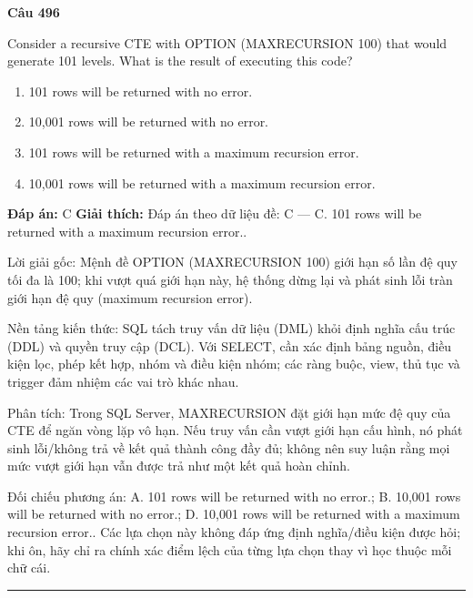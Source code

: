 \documentclass[11pt,a4paper]{article}
\newenvironment{question}[1]{%
  \par\vspace{1em}\noindent\textbf{\large Câu #1}\par\vspace{0.4em}
}{%
  \par\vspace{1em}\hrule\vspace{0.6em}
}
\newenvironment{choices}{%
  \begin{enumerate}[label=\textbf{\Alph*.},leftmargin=2.2em,itemsep=2pt,topsep=3pt]
}{%
  \end{enumerate}
}
\newcommand{\choice}{\item}
\begin{document}
\begin{question}{496}
Consider a recursive CTE with OPTION (MAXRECURSION 100) that would generate 101 levels. What is the result of executing this code?
\begin{choices}
\choice 101 rows will be returned with no error.
\choice 10,001 rows will be returned with no error.
\choice 101 rows will be returned with a maximum recursion error.
\choice 10,001 rows will be returned with a maximum recursion error.
\end{choices}
\textbf{Đáp án:} C
\textbf{Giải thích:} Đáp án theo dữ liệu đề: C — C. 101 rows will be returned with a maximum recursion error..

Lời giải gốc: Mệnh đề OPTION (MAXRECURSION 100) giới hạn số lần đệ quy tối đa là 100; khi vượt quá giới hạn này, hệ thống dừng lại và phát sinh lỗi tràn giới hạn đệ quy (maximum recursion error).

Nền tảng kiến thức: SQL tách truy vấn dữ liệu (DML) khỏi định nghĩa cấu trúc (DDL) và quyền truy cập (DCL). Với SELECT, cần xác định bảng nguồn, điều kiện lọc, phép kết hợp, nhóm và điều kiện nhóm; các ràng buộc, view, thủ tục và trigger đảm nhiệm các vai trò khác nhau.

Phân tích: Trong SQL Server, MAXRECURSION đặt giới hạn mức đệ quy của CTE để ngăn vòng lặp vô hạn. Nếu truy vấn cần vượt giới hạn cấu hình, nó phát sinh lỗi/không trả về kết quả thành công đầy đủ; không nên suy luận rằng mọi mức vượt giới hạn vẫn được trả như một kết quả hoàn chỉnh.

Đối chiếu phương án: A. 101 rows will be returned with no error.; B. 10,001 rows will be returned with no error.; D. 10,001 rows will be returned with a maximum recursion error.. Các lựa chọn này không đáp ứng định nghĩa/điều kiện được hỏi; khi ôn, hãy chỉ ra chính xác điểm lệch của từng lựa chọn thay vì học thuộc mỗi chữ cái.
\end{question}
\end{document}
